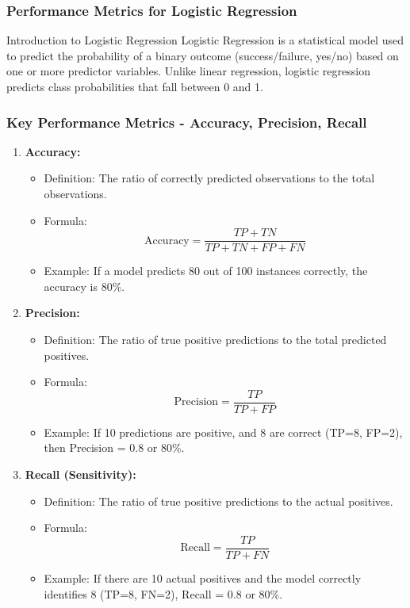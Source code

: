 \documentclass[aspectratio=169]{beamer}
\begin{document}
\begin{frame}[fragile]
    \frametitle{Performance Metrics for Logistic Regression}
    \begin{block}{Introduction to Logistic Regression}
        Logistic Regression is a statistical model used to predict the probability of a binary outcome (success/failure, yes/no) based on one or more predictor variables. Unlike linear regression, logistic regression predicts class probabilities that fall between 0 and 1.
    \end{block}
\end{frame}

\begin{frame}[fragile]
    \frametitle{Key Performance Metrics - Accuracy, Precision, Recall}
    \begin{enumerate}
        \item \textbf{Accuracy:}
        \begin{itemize}
            \item Definition: The ratio of correctly predicted observations to the total observations.
            \item Formula: 
            \[
            \text{Accuracy} = \frac{TP + TN}{TP + TN + FP + FN}
            \]
            \item Example: If a model predicts 80 out of 100 instances correctly, the accuracy is 80\%.
        \end{itemize}

        \item \textbf{Precision:}
        \begin{itemize}
            \item Definition: The ratio of true positive predictions to the total predicted positives.
            \item Formula:
            \[
            \text{Precision} = \frac{TP}{TP + FP}
            \]
            \item Example: If 10 predictions are positive, and 8 are correct (TP=8, FP=2), then Precision = 0.8 or 80\%.
        \end{itemize}

        \item \textbf{Recall (Sensitivity):}
        \begin{itemize}
            \item Definition: The ratio of true positive predictions to the actual positives.
            \item Formula:
            \[
            \text{Recall} = \frac{TP}{TP + FN}
            \]
            \item Example: If there are 10 actual positives and the model correctly identifies 8 (TP=8, FN=2), Recall = 0.8 or 80\%.
        \end{itemize}
    \end{enumerate}
\end{frame}
\end{document}
